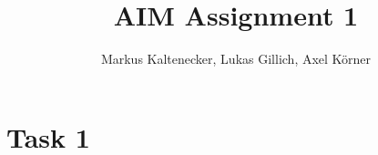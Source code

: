 \documentclass{article}
\title{AIM Assignment 1}
\author{Markus Kaltenecker, Lukas Gillich, Axel Körner}
\begin{document}
    \maketitle

    \section{Task 1}

    \subsection{}
\end{document}
